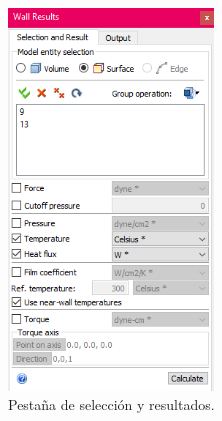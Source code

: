\begin{enumerate}
\begin{enumerate}
	\end{enumerate}
	\begin{figure}[h]
		\centering
		\begin{subfigure}[b]{0.48\textwidth}
			\centering
			\includegraphics[width=0.6\textwidth]{figuras/Procedimiento_Simulaciones/Conduccion/ventana_wall_calculator.png}
			\caption{Pestaña de selección y resultados.}
			\label{fig:ventana_wall_calculator_control}
		\end{subfigure}
	  \hfill
		\begin{subfigure}[b]{0.48\textwidth}
			\centering

\end{subfigure}
\end{figure}
\end{enumerate}
